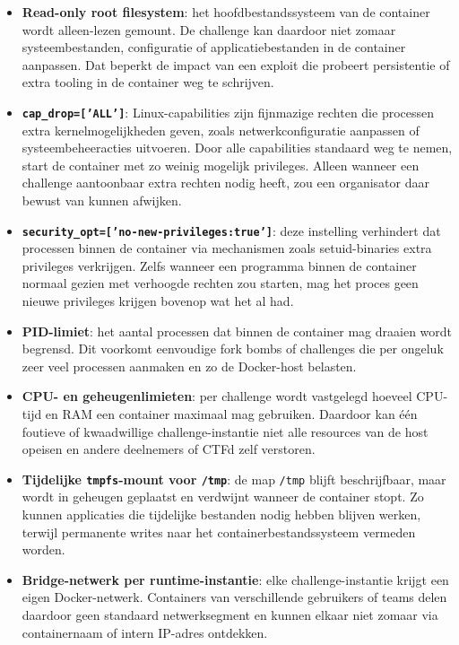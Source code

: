 \begin{itemize}
  \item \textbf{Read-only root filesystem}: het hoofdbestandssysteem van de container wordt alleen-lezen gemount. De challenge kan daardoor niet zomaar systeembestanden, configuratie of applicatiebestanden in de container aanpassen. Dat beperkt de impact van een exploit die probeert persistentie of extra tooling in de container weg te schrijven.
    \item \textbf{\texttt{cap\_drop=['ALL']}}: Linux-capabilities zijn fijnmazige rechten die processen extra kernelmogelijkheden geven, zoals netwerkconfiguratie aanpassen of systeembeheeracties uitvoeren. Door alle capabilities standaard weg te nemen, start de container met zo weinig mogelijk privileges. Alleen wanneer een challenge aantoonbaar extra rechten nodig heeft, zou een organisator daar bewust van kunnen afwijken.
  \item \textbf{\texttt{security\_opt=['no-new-privileges:true']}}: deze instelling verhindert dat processen binnen de container via mechanismen zoals setuid-binaries extra privileges verkrijgen. Zelfs wanneer een programma binnen de container normaal gezien met verhoogde rechten zou starten, mag het proces geen nieuwe privileges krijgen bovenop wat het al had.
  \item \textbf{PID-limiet}: het aantal processen dat binnen de container mag draaien wordt begrensd. Dit voorkomt eenvoudige fork bombs of challenges die per ongeluk zeer veel processen aanmaken en zo de Docker-host belasten.
  \item \textbf{CPU- en geheugenlimieten}: per challenge wordt vastgelegd hoeveel CPU-tijd en RAM een container maximaal mag gebruiken. Daardoor kan één foutieve of kwaadwillige challenge-instantie niet alle resources van de host opeisen en andere deelnemers of CTFd zelf verstoren.
  \item \textbf{Tijdelijke \texttt{tmpfs}-mount voor \texttt{/tmp}}: de map \texttt{/tmp} blijft beschrijfbaar, maar wordt in geheugen geplaatst en verdwijnt wanneer de container stopt. Zo kunnen applicaties die tijdelijke bestanden nodig hebben blijven werken, terwijl permanente writes naar het containerbestandssysteem vermeden worden.
  \item \textbf{Bridge-netwerk per runtime-instantie}: elke challenge-instantie krijgt een eigen Docker-netwerk. Containers van verschillende gebruikers of teams delen daardoor geen standaard netwerksegment en kunnen elkaar niet zomaar via containernaam of intern IP-adres ontdekken.
\end{itemize}

